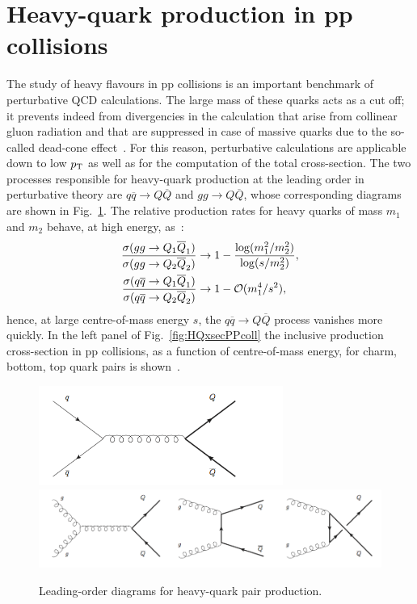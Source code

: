 \section{Heavy-quark production in pp collisions}
\label{sec:HFpp}
The study of heavy flavours in pp collisions is an 
important benchmark of perturbative QCD calculations. 
The large mass of these quarks acts as a cut off; it prevents 
indeed from divergencies in the calculation that arise
from collinear gluon radiation and that are suppressed 
in case of massive quarks due to the
so-called dead-cone effect~\cite{Dokshitzer:1991fd}. 
For this reason, perturbative calculations are applicable down to low $p_{\rm T}$ 
as well as for the computation of the total cross-section. 
The two processes responsible for heavy-quark production 
at the leading order in perturbative theory are 
$q \overline{q} \rightarrow Q \overline{Q}$ and $gg \rightarrow Q \overline{Q}$, 
whose corresponding diagrams are
shown in Fig.~\ref{fig:LOdiagrams}. The relative production 
rates for heavy quarks of mass 
$m_1$ and $m_2$ behave, at high energy, as~\cite{Mangano:1997ri}:
\begin{equation}
\begin{aligned}
\frac{\sigma (gg \rightarrow Q_1 \overline{Q}_1)}{\sigma (gg \rightarrow Q_2 \overline{Q}_2)} & \rightarrow 1 - \frac{{\rm log}(m_1^2/m_2^2)}{{\rm log}(s/m_2^2)}, \\
\frac{\sigma (q \overline{q} \rightarrow Q_1 \overline{Q}_1)}{\sigma (q \overline{q} \rightarrow Q_2 \overline{Q}_2)} & \rightarrow 1 - \mathcal{O} (m_1^4/s^2),
\end{aligned}
\end{equation}
hence, at large centre-of-mass energy $s$, the 
$q \overline{q} \rightarrow Q \overline{Q}$ process
vanishes more quickly. In the left panel of Fig.~\ref{fig:HQxsecPPcoll}
 the inclusive production cross-section in pp collisions,
as a function of centre-of-mass energy, for charm, bottom, 
top quark pairs is shown~\cite{Mangano:1997ri}.
\begin{figure}[!ht]
  \centering
  \includegraphics[width=8cm]{FigCap2/Feymann1.png}
  \includegraphics[width=15cm]{FigCap2/Feymann2.png}
  \caption{Leading-order diagrams for heavy-quark pair production.}
  \label{fig:LOdiagrams}
\end{figure}

